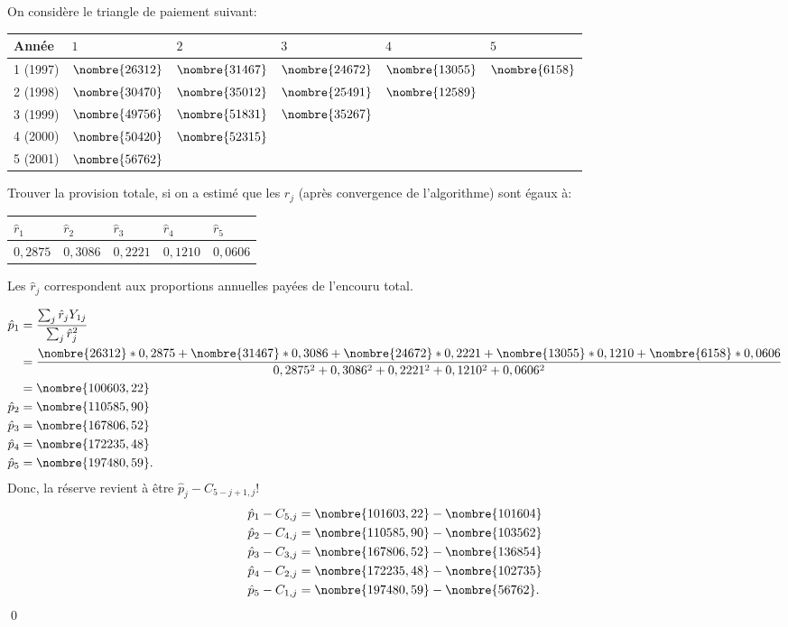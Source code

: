 \begin{exemple}
  On considère le triangle de paiement suivant:
  \begin{center}
    \begin{tabular}{|l|l l l l l|}\hline
      Année & $1$ & $2$ & $3$ & $4$ & $5$  \\ \hline
      1 (1997)& $\nombre{26312}$ & $\nombre{31467}$ & $\nombre{24672}$ & $\nombre{13055}$ & $\nombre{6158}$ \\
      2 (1998)& $\nombre{30470}$ & $\nombre{35012}$ & $\nombre{25491}$ & $\nombre{12589}$ &  \\
      3 (1999)& $\nombre{49756}$ & $\nombre{51831}$ & $\nombre{35267}$ &&\\
      4 (2000)& $\nombre{50420}$ & $\nombre{52315}$ & &&\\
      5 (2001)& $\nombre{56762}$ &  &&&\\ \hline
    \end{tabular}
  \end{center}
  Trouver la provision totale, si on a estimé que les $\hat{r}_{j}$
  (après convergence de l'algorithme) sont égaux à:
  \begin{center}
    \begin{tabular}{|l l l l l|}\hline
      $\hat{r}_1$ & $\hat{r}_2$ & $\hat{r}_3$ & $\hat{r}_4$ & $\hat{r}_5$ \\ \hline
      $0,2875$ &$0,3086$ &$0,2221$ &$0,1210$ &$0,0606$ \\ \hline
    \end{tabular}
  \end{center}
  Les $\hat{r}_{j}$ correspondent aux proportions annuelles payées de
  l'encouru total.

  \begin{align*}
    \hat{p}_{1} &= \frac{\sum_{j} \hat{r}_{j} Y_{1 j}}{\sum_{j} \hat{r}_{j}^2 }\\
                &= \frac{\nombre{26312}*0,2875 +\nombre{31467}*0,3086 + \nombre{24672}*0,2221 + \nombre{13055}*0,1210 + \nombre{6158}*0,0606}
                  {0,2875^2 + 0,3086^2 + 0,2221^2 + 0,1210^2 + 0,0606^2} \\
                &= \nombre{100603,22} \\
    \hat{p}_{2} &= \nombre{110585,90} \\
    \hat{p}_{3} &= \nombre{167806,52} \\
    \hat{p}_{4} &= \nombre{172235,48} \\
    \hat{p}_{5} &= \nombre{197480,59}.
  \end{align*}
  Donc, la réserve revient à être $\hat{p}_j - C_{5-j+1,j}$!
  \begin{align*}
    \hat{p}_1 - C_{5,j} &= \nombre{101603,22} - \nombre{101604} \\
    \hat{p}_2 - C_{4,j} &= \nombre{110585,90} - \nombre{103562} \\
    \hat{p}_3 - C_{3,j} &= \nombre{167806,52} - \nombre{136854} \\
    \hat{p}_4 - C_{2,j} &= \nombre{172235,48} - \nombre{102735} \\
    \hat{p}_5 - C_{1,j} &= \nombre{197480,59} - \nombre{56762}.
  \end{align*}
  \qed
\end{exemple}


